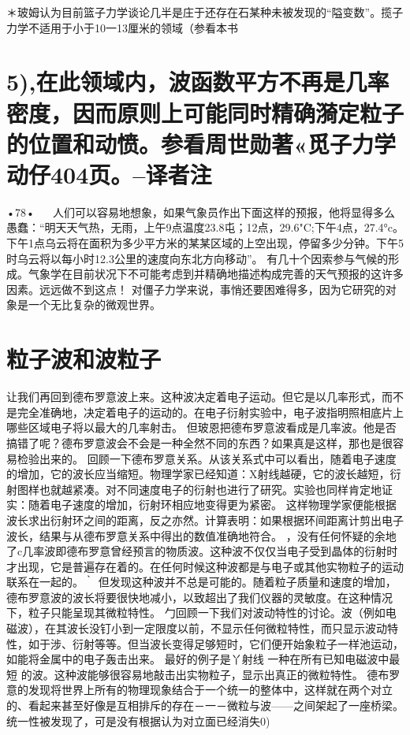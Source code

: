 ＊玻姆认为目前篮子力学谈论几半是庄于还存在石某种未被发现的“隘变数”。揽子力学不适用于小于10一13厘米的领域（参看本书\section{5),在此领域内，波函数平方不再是几率密度，因而原则上可能同时精确漪定粒子的位置和动愤。参看周世勋著«觅子力学动仔404页。--译者注}

•78•
  
人们可以容易地想象，如果气象员作出下面这样的预报，他将显得多么愚蠢：“明天天气热，无雨，上午9点温度23.8屯；12点，29.6"C;下午4点，27.4°c。下午1点乌云将在面积为多少平方米的某某区域的上空出现，停留多少分钟。下午5时乌云将以每小时12.3公里的速度向东北方向移动”。
有几十个因索参与气候的形成。气象学在目前状况下不可能考虑到并精确地描述构成完善的天气预报的这许多因素。远远做不到这点！
对僵子力学来说，事悄还要困难得多，因为它研究的对象是一个无比复杂的微观世界。

\section{粒子波和波粒子}

让我们再回到德布罗意波上来。这种波决定着电子运动。但它是以几率形式，而不是完全准确地，决定着电子的运动的。在电子衍射实验中，电子波指明照相底片上哪些区域电子将以最大的几率射击。
但玻恩把德布罗意波看成是几率波。他是否搞错了呢？德布罗意波会不会是一种全然不同的东西？如果真是这样，那也是很容易检验出来的。
回顾一下德布罗意关系。从该关系式中可以看出，随着电子速度的增加，它的波长应当缩短。物理学家已经知道：X射线越硬，它的波长越短，衍射图样也就越紧凑。对不同速度电子的衍射也进行了研究。实验也同样肯定地证实：随着电子速度的增加，衍射环相应地变得更为紧密。
这样物理学家便能根据波长求出衍射环之间的距离，反之亦然。计算表明：如果根据环间距离计剪出电子波长，结果与从德布罗意关系中得出的数值准确地符合。
，没有任何怀疑的余地了c几率波即德布罗意曾经预言的物质波。这种波不仅仅当电子受到晶体的衍射时才出现，它是普遍存在着的。在任何时候这种波都是与电子或其他实物粒子的运动联系在一起的。｀
但发现这种波并不总是可能的。随着粒子质量和速度的增加，德布罗意波的波长将要很快地减小，以致超出了我们仪器的灵敏度。在这种情况下，粒子只能呈现其微粒特性。
勹回顾一下我们对波动特性的讨论。波（例如电磁波），在其波长没钉小到一定限度以前，不显示任何微粒特性，而只显示波动特性，如于涉、衍射等等。但当波长变得足够短时，它们便开始象粒子一样池运动，如能将金属中的电子轰击出来。
	最好的例子是丫射线	一种在所有已知电磁波中最短
的波。这种波能够很容易地敲击出实物粒子，显示出真正的微粒特性。
德布罗意的发现将世界上所有的物理现象结合于一个统一的整体中，这样就在两个对立的、看起来甚至好像是互相排斥的存在－一－微粒与波——之间架起了一座桥梁。统一性被发现了，可是没有根据认为对立面已经消失0)


